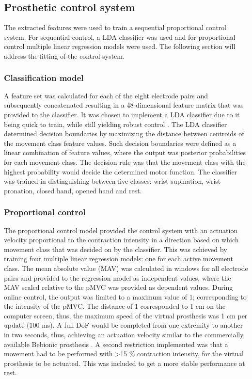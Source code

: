 \subsection{Prosthetic control system}

The extracted features were used to train a sequential proportional control system. For sequential control, a LDA classifier was used and for proportional control multiple linear regression models were used. The following section will address the fitting of the control system. 

\subsubsection{Classification model}
A feature set was calculated for each of the eight electrode pairs and subsequently concatenated resulting in a 48-dimensional feature matrix that was provided to the classifier. It was chosen to implement a LDA classifier due to it being quick to train, while still yielding robust control \cite{Englehart2003}. The LDA classifier determined decision boundaries by maximizing the distance between centroids of the movement class feature values. Such decision boundaries were defined as a linear combination of feature values, where the output was posterior probabilities for each movement class. The decision rule was that the movement class with the highest probability would decide the determined motor function. The classifier was trained in distinguishing between five classes: wrist supination, wrist pronation, closed hand, opened hand and rest.  

\subsubsection{Proportional control}
The proportional control model provided the control system with an actuation velocity proportional to the contraction intensity in a direction based on which movement class that was decided on by the classifier. This was achieved by training four multiple linear regression models: one for each active movement class. The mean absolute value (MAV) was calculated in windows for all electrode pairs and provided to the regression model as independent values, where the MAV scaled relative to the pMVC was provided as dependent values. During online control, the output was limited to a maximum value of 1; corresponding to the intensity of the pMVC. The distance of 1 corresponded to 1 cm on the computer screen, thus, the maximum speed of the virtual prosthesis was 1 cm per update (100 ms). A full DoF would be completed from one extremity to another in two seconds, thus, achieving an actuation velocity similar to the commercially available Bebionic prosthesis \cite{Belter2013}. A second restriction implemented was that a movement had to be performed with >15 $\%$ contraction intensity, for the virtual prosthesis to be actuated. This was included to get a more stable performance at rest. 